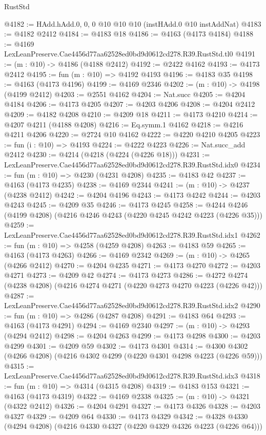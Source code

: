 \begin{lexlean}{RustStd}
\begin{coremodule}
@4182 := HAdd.hAdd.{0, 0, 0} @10 @10 @10 (instHAdd.{0} @10 instAddNat)
@4183 := @4182 @2412
@4184 := @4183 @18
@4186 := @4163 (@4173 @4184)
@4188 := @4169 LexLeanPreserve.Cae4456d77aa62528ed0bd9d0612cd278.R39.RustStd.tl0
@4191 := (m : @10) -> @4186 (@4188 @2412)
@4192 := @2422 @4162
@4193 := @4173 @2412
@4195 := fun (m : @10) => @4192 @4193
@4196 := @4183 @35
@4198 := @4163 (@4173 @4196)
@4199 := @4169 @2346
@4202 := (m : @10) -> @4198 (@4199 @2412)
@4203 := @2551 @4162
@4204 := Nat.succ
@4205 := @4204 @4184
@4206 := @4173 @4205
@4207 := @4203 @4206
@4208 := @4204 @2412
@4209 := @4182 @4208
@4210 := @4209 @18
@4211 := @4173 @4210
@4214 := @4207 @4211 (@4188 @4208)
@4216 := Eq.symm.{1} @4162
@4218 := @4216 @4211 @4206
@4220 := @2724 @10 @4162
@4222 := @4220 @4210 @4205
@4223 := fun (i : @10) => @4193
@4224 := @4222 @4223
@4226 := Nat.succ_add @2412
@4230 := @4214 (@4218 (@4224 (@4226 @18)))
@4231 := LexLeanPreserve.Cae4456d77aa62528ed0bd9d0612cd278.R39.RustStd.idx0
@4234 := fun (m : @10) => @4230 (@4231 @4208)
@4235 := @4183 @42
@4237 := @4163 (@4173 @4235)
@4238 := @4169 @2344
@4241 := (m : @10) -> @4237 (@4238 @2412)
@4242 := @4204 @4196
@4243 := @4173 @4242
@4244 := @4203 @4243
@4245 := @4209 @35
@4246 := @4173 @4245
@4258 := @4244 @4246 (@4199 @4208) (@4216 @4246 @4243 (@4220 @4245 @4242 @4223 (@4226 @35)))
@4259 := LexLeanPreserve.Cae4456d77aa62528ed0bd9d0612cd278.R39.RustStd.idx1
@4262 := fun (m : @10) => @4258 (@4259 @4208)
@4263 := @4183 @59
@4265 := @4163 (@4173 @4263)
@4266 := @4169 @2342
@4269 := (m : @10) -> @4265 (@4266 @2412)
@4270 := @4204 @4235
@4271 := @4173 @4270
@4272 := @4203 @4271
@4273 := @4209 @42
@4274 := @4173 @4273
@4286 := @4272 @4274 (@4238 @4208) (@4216 @4274 @4271 (@4220 @4273 @4270 @4223 (@4226 @42)))
@4287 := LexLeanPreserve.Cae4456d77aa62528ed0bd9d0612cd278.R39.RustStd.idx2
@4290 := fun (m : @10) => @4286 (@4287 @4208)
@4291 := @4183 @64
@4293 := @4163 (@4173 @4291)
@4294 := @4169 @2340
@4297 := (m : @10) -> @4293 (@4294 @2412)
@4298 := @4204 @4263
@4299 := @4173 @4298
@4300 := @4203 @4299
@4301 := @4209 @59
@4302 := @4173 @4301
@4314 := @4300 @4302 (@4266 @4208) (@4216 @4302 @4299 (@4220 @4301 @4298 @4223 (@4226 @59)))
@4315 := LexLeanPreserve.Cae4456d77aa62528ed0bd9d0612cd278.R39.RustStd.idx3
@4318 := fun (m : @10) => @4314 (@4315 @4208)
@4319 := @4183 @153
@4321 := @4163 (@4173 @4319)
@4322 := @4169 @2338
@4325 := (m : @10) -> @4321 (@4322 @2412)
@4326 := @4204 @4291
@4327 := @4173 @4326
@4328 := @4203 @4327
@4329 := @4209 @64
@4330 := @4173 @4329
@4342 := @4328 @4330 (@4294 @4208) (@4216 @4330 @4327 (@4220 @4329 @4326 @4223 (@4226 @64)))

\end{coremodule}
\end{lexlean}
